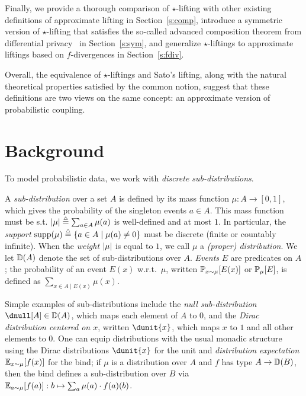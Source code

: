 \documentclass{lmcs}
\begin{document}
Finally, we provide a thorough comparison of $\star$-lifting with other existing
definitions of approximate lifting in Section~\ref{s:comp}, introduce a
symmetric version of $\star$-lifting that satisfies the so-called advanced
composition theorem from differential privacy~\cite{DRV10} in
Section~\ref{s:sym}, and generalize $\star$-liftings to approximate liftings
based on $f$-divergences in Section~\ref{s:fdiv}.

Overall, the equivalence of $\star$-liftings and Sato's lifting, along with the
natural theoretical properties satisfied by the common notion, suggest that
these definitions are two views on the same concept: an approximate version of
probabilistic coupling.

\section{Background} \label{s:bg}

To model probabilistic data, we work with \emph{discrete sub-distributions}.

\begin{defi}
  A \emph{sub-distribution} over a set $A$ is defined by its
  mass function $\mu : A \to [0, 1]$, which gives the probability of the
  singleton events $a \in A$. This mass function must be s.t.
  $\mass{\mu} \eqdef \sum_{a \in A} \mu(a)$ is well-defined and at most $1$.
  In particular, the \emph{support}
  $\supp(\mu) \eqdef \{ a \in A \mid \mu(a) \neq 0 \}$
  must be discrete (\ie finite or countably infinite).
  When the \emph{weight} $\mass{\mu}$ is equal to $1$, we call $\mu$ a
  \emph{(proper) distribution}.  We let $\Dist(A)$ denote the set of
  sub-distributions over $A$.
  \emph{Events} $E$ are predicates on $A$; the probability of an event $E(x)$
  w.r.t.\ $\mu$, written $\P{x}{\mu}{E(x)}$ or $\sP{\mu}{E}$, is defined as
  $\sum_{x \in A \mid E(x)} \mu(x)$.
\end{defi}

Simple examples of sub-distributions include the \emph{null
  sub-distribution} $\dnull[A] \in \Dist(A)$, which maps each element
of $A$ to $0$, and the \emph{Dirac distribution centered on $x$},
written $\dunit{x}$, which maps $x$ to $1$ and all other elements to
$0$.
%
One can equip distributions with the usual monadic structure using the Dirac
distributions $\dunit{x}$ for the unit and \emph{distribution
  expectation} $\dlet x \mu {f(x)}$ for the bind; if $\mu$ is a
distribution over $A$ and $f$ has type $A \to \Dist(B)$, then the bind
defines a sub-distribution over $B$ via
%
$\dlet a \mu {f(a)} : b \mapsto \sum_{a} \mu(a) \cdot f(a)(b)$.
\end{document}
